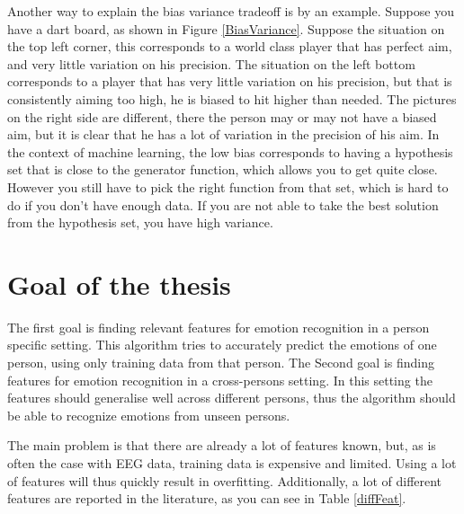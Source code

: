 Another way to explain the bias variance tradeoff is by an example. Suppose you have a dart board, as shown in Figure \ref{BiasVariance}. Suppose the situation on the top left corner, this corresponds to a world class player that has perfect aim, and very little variation on his precision. The situation on the left bottom corresponds to a player that has very little variation on his precision, but that is consistently aiming too high, he is biased to hit higher than needed. The pictures on the right side are different, there the person may or may not have a biased aim, but it is clear that he has a lot of variation in the precision of his aim.
\npar
In the context of machine learning, the low bias corresponds to having a hypothesis set that is close to the generator function, which allows you to get quite close. However you still have to pick the right function from that set, which is hard to do if you don't have enough data. If you are not able to take the best solution from the hypothesis set, you have high variance.


\section{Goal of the thesis}
The first goal is finding relevant features for emotion recognition in a person specific setting. This algorithm tries to accurately predict the emotions of one person, using only training data from that person. The Second goal is finding features for emotion recognition in a cross-persons setting. In this setting the features should generalise well across different persons, thus the algorithm should be able to recognize emotions from unseen persons.

\npar

The main problem is that there are already a lot of features known, but, as is often the case with EEG data, training data is expensive and limited. Using a lot of features will thus quickly result in overfitting. Additionally, a lot of different features are reported in the literature, as you can see in Table \ref{diffFeat}.

